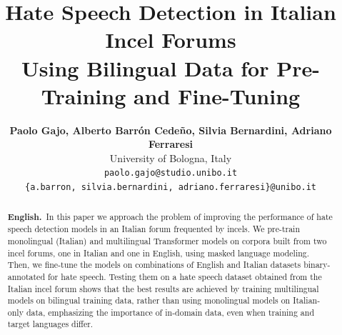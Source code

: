 \documentclass[11pt]{article}
\title{Hate Speech Detection in Italian Incel Forums \\ Using Bilingual Data for Pre-Training and Fine-Tuning}
\author{\textbf{Paolo Gajo, Alberto Barrón Cedeño, Silvia Bernardini, Adriano Ferraresi} \\
  University of Bologna, Italy \\
  {\tt paolo.gajo@studio.unibo.it}\\
  {\tt \{a.barron, silvia.bernardini, adriano.ferraresi\}@unibo.it}}
\date{}
\begin{document}
\maketitle
\begin{abstract}
\textbf{English.}~In this paper we approach the problem of improving the performance of hate speech detection models in
an Italian forum frequented by incels.
We pre-train monolingual (Italian) and multilingual Transformer models on corpora built from two incel forums, one in Italian and one in English, using masked language modeling. Then, we fine-tune the models on combinations of English and Italian datasets binary-annotated for hate speech.
Testing them on a hate speech dataset obtained from the Italian incel forum shows that the best results are achieved by training multilingual models on bilingual training data,
rather than using monolingual models on Italian-only data, emphasizing the importance of in-domain data, even when training and target languages differ.


\end{abstract}
\end{document}
